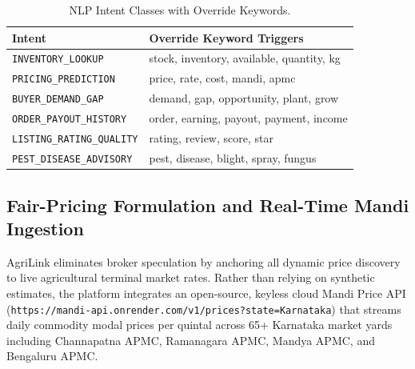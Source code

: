 \begin{table}[htbp]
    \centering
    \caption{NLP Intent Classes with Override Keywords.}
    \label{tab:intents}
    \begin{tabular}{|l|l|}
    \hline
    \textbf{Intent} & \textbf{Override Keyword Triggers} \\ \hline
    \texttt{INVENTORY\_LOOKUP}        & stock, inventory, available, quantity, kg \\ \hline
    \texttt{PRICING\_PREDICTION}      & price, rate, cost, mandi, apmc \\ \hline
    \texttt{BUYER\_DEMAND\_GAP}       & demand, gap, opportunity, plant, grow \\ \hline
    \texttt{ORDER\_PAYOUT\_HISTORY}   & order, earning, payout, payment, income \\ \hline
    \texttt{LISTING\_RATING\_QUALITY} & rating, review, score, star \\ \hline
    \texttt{PEST\_DISEASE\_ADVISORY}  & pest, disease, blight, spray, fungus \\ \hline
    \end{tabular}
\end{table}

\subsection{Fair-Pricing Formulation and Real-Time Mandi Ingestion}
\label{subsec:fair_pricing}
AgriLink eliminates broker speculation by anchoring all dynamic price discovery to live agricultural terminal market rates. Rather than relying on synthetic estimates, the platform integrates an open-source, keyless cloud Mandi Price API (\texttt{https://mandi-api.onrender.com/v1/prices?state=Karnataka}) that streams daily commodity modal prices per quintal across 65+ Karnataka market yards including Channapatna APMC, Ramanagara APMC, Mandya APMC, and Bengaluru APMC. 

